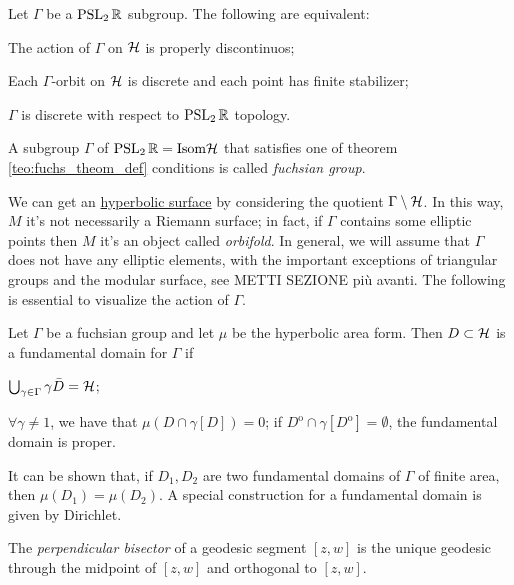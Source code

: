\begin{nteo}
\label{teo:fuchs_theom_def}
Let $\Gamma$ be a $\operatorname{PSL}_{2}\mathbb{R}$ subgroup. The following are equivalent:
\begin{compactitem}
\item The action of $\Gamma$ on $\mathcal{H}$ is properly discontinuos;
\item Each $\Gamma$-orbit on $\mathcal{H}$ is discrete and each point has finite stabilizer;
\item $\Gamma$ is discrete with respect to $\operatorname{PSL}_{2}\mathbb{R}$ topology.
\end{compactitem}
\end{nteo}


\begin{defin}
\label{def:fucs_def}
A subgroup $\Gamma$ of $\operatorname{PSL}_{2}\mathbb{R}=\mathrm{Isom}\mathcal{H}$ that satisfies one of theorem \ref{teo:fuchs_theom_def} conditions is called \emph{fuchsian group}.
\end{defin}

We can get an \underline{hyperbolic surface} by considering the quotient $\Gamma\setminus\mathcal{H}$. In this way, $M$ it's not necessarily a Riemann surface; in fact, if $\Gamma$ contains some elliptic points then $M$ it's an object called \emph{orbifold}. In general, we will assume that $\Gamma$ does not have any elliptic elements, with the important exceptions of triangular groups and the modular surface, see METTI SEZIONE più avanti. The following is essential to visualize the action of $\Gamma$.

\begin{defin}
\label{def:fund_domain}
Let $\Gamma$ be a fuchsian group and let $\mu$ be the hyperbolic area form. Then $D\subset\mathcal{H}$ is a fundamental domain for $\Gamma$ if 
\begin{compactitem}
\item $\bigcup_{\gamma\in \Gamma}\gamma\bar{D}=\mathcal{H}$;
\item $\forall\gamma\neq1$, we have that $\mu(D\cap\gamma[D])=0$; if $D^{\mathrm{o}}\cap\gamma[D^{\mathrm{o}}]=\emptyset$, the fundamental domain is proper. 
\end{compactitem} 
\end{defin}

It can be shown that, if $D_{1},D_{2}$ are two fundamental domains of $\Gamma$ of finite area, then $\mu(D_{1})=\mu(D_{2})$. A special construction for a fundamental domain is given by Dirichlet.

\begin{defin}
The \emph{perpendicular bisector} of a geodesic segment $[z,w]$ is the unique geodesic through the midpoint of $[z,w]$ and orthogonal to $[z,w]$.
\end{defin}

